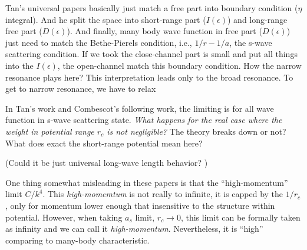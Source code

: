 Tan's universal papers\cite{Tan2008-1,Tan2008-2} basically just match a free part into boundary condition ($\eta$ integral).  And he split the space into short-range part ($I(\epsilon)$) and long-range free part ($D(\epsilon)$).  And finally, many body wave function in free part ($D(\epsilon)$) just need to match the Bethe-Pierels condition, i.e., $1/r-1/a$, the s-wave scattering condition.  If we took the close-channel part is small and put all things into the $I(\epsilon)$, the open-channel match this boundary condition.  How the narrow resonance plays here? This interpretation leads only to the broad resonance. To get to narrow resonance, we have to relax 


In Tan's work and Combescot's following work\cite{CombescotTan}, the limiting is for all wave function in s-wave scattering state. \emph{What happens for the real case where the weight in potential range $r_{c}$ is not negligible?} The theory breaks down or not?  What does exact the short-range potential mean here?

(Could it be just universal long-wave length behavior? )

One thing somewhat misleading in these papers is that the ``high-momentum'' limit $C/k^{4}$.  This \emph{high-momemtum} is not really to infinite, it is capped by the $1/r_{c}$, only for momentum lower enough that insensitive to the structure within potential.  However, when taking $a_{s}$ limit, $r_{c}\rightarrow0$, this limit can be formally taken as infinity and we can call it \emph{high-momentum}.  Nevertheless, it is ``high'' comparing to many-body characteristic.  



